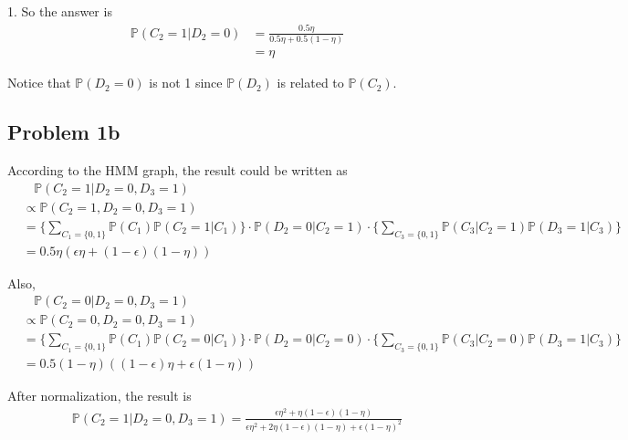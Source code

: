 \documentclass[paper=a4, fontsize=10pt]{scrartcl} %
\numberwithin{equation}{section} %
\numberwithin{figure}{section} %
\numberwithin{table}{section} %
\begin{document}
\begin{spacing}{1.}
So the answer is
\begin{displaymath}
\begin{aligned}
\mathbb{P}(C_{2}=1|D_{2}=0) &= \frac{0.5 \eta}{0.5 \eta + 0.5 (1 - \eta)}\\
&= \eta
\end{aligned}
\end{displaymath}

Notice that $\mathbb{P}(D_{2}=0)$ is not 1 since $\mathbb{P}(D_{2})$ is related to $\mathbb{P}(C_{2})$.

\subsection{Problem 1b}
According to the HMM graph, the result could be written as
\begin{displaymath}
\begin{aligned}
&\ \ \ \ \mathbb{P}(C_{2}=1|D_{2}=0, D_{3}=1) \\
&\propto  \mathbb{P}(C_{2}=1, D_{2}=0, D_{3}=1)\\
&=\{\sum_{C_{1} = \{0, 1\}}\mathbb{P}(C_{1})\mathbb{P}(C_{2} = 1|C_{1})\} \cdot \mathbb{P}(D_{2}=0|C_{2}=1) \cdot \{\sum_{C_{3} = \{0, 1\}}\mathbb{P}(C_{3}|C_{2}=1)\mathbb{P}(D_{3}=1|C_{3})\}\\
& = 0.5\eta(\epsilon\eta+(1-\epsilon)(1-\eta))
\end{aligned}
\end{displaymath}

Also,
\begin{displaymath}
\begin{aligned}
&\ \ \ \ \mathbb{P}(C_{2}=0|D_{2}=0, D_{3}=1) \\
&\propto  \mathbb{P}(C_{2}=0, D_{2}=0, D_{3}=1)\\
&=\{\sum_{C_{1} = \{0, 1\}}\mathbb{P}(C_{1})\mathbb{P}(C_{2} = 0|C_{1})\} \cdot \mathbb{P}(D_{2}=0|C_{2}=0) \cdot \{\sum_{C_{3} = \{0, 1\}}\mathbb{P}(C_{3}|C_{2}=0)\mathbb{P}(D_{3}=1|C_{3})\}\\
& = 0.5(1-\eta)((1-\epsilon)\eta+\epsilon(1-\eta))
\end{aligned}
\end{displaymath}

After normalization, the result is 
\begin{displaymath}
\begin{aligned}
\mathbb{P}(C_{2}=1|D_{2}=0, D_{3}=1) = \frac{\epsilon\eta^{2} + \eta(1-\epsilon)(1-\eta)}{\epsilon\eta^{2} + 2\eta(1-\epsilon)(1-\eta) + \epsilon(1-\eta)^{2}}
\end{aligned}
\end{displaymath}


\end{spacing}
\end{document}
